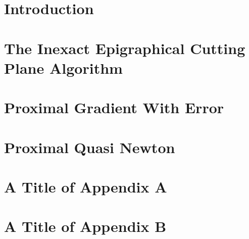    \mainmatter
   
   \pagestyle{maintext}
   
   
   \chapter{Introduction}
   \label{ch:IntroductionLabel}
   

   \chapter{The Inexact Epigraphical Cutting Plane Algorithm}
   \label{ch:InexactEpiCuttingPlane}
   

   \chapter[Proximal Gradient With Error]{ Proximal Gradient With Error }
   \label{ch:ProximalGradientError}
   
   
   \chapter[Proximal Quasi Newton]{ Proximal Quasi Newton}%
   \label{ch:ProximalGradientCurvature}
   
   
   \appendix

   \chapter[A Title of Appendix A]{A Title of Appendix A}
   \label{ch:AppendixALabel}
   

   \chapter[A Title of Appendix A]{A Title of Appendix B}
   \label{ch:AppendixBLabel}
   

   \backmatter

   
   
   
